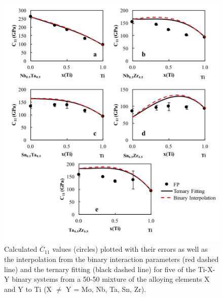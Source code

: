 \pagebreak
\begin{figure}[H]
	\centering
	\includegraphics[width=\textwidth]{Chapter-6/Figures/tixyc112.png}
	\caption{Calculated $\overline{C}_{11}$ values (circles) plotted with their errors as well as the interpolation from the binary interaction parameters (red dashed line) and the ternary fitting (black dashed line) for five of the Ti-X-Y binary systems from a 50-50 mixture of the alloying elements X and Y to Ti (X $\neq$ Y = Mo, Nb, Ta, Sn, Zr).}
	\label{Ch6-figure:tixyc11_2}
\end{figure}


